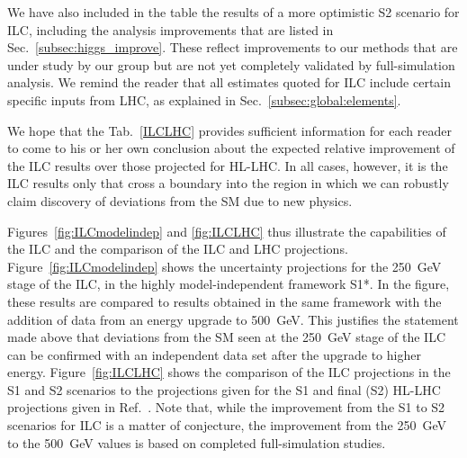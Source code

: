    We
have also included in the table the results of a more  optimistic S2
scenario for ILC,  including the analysis improvements that are listed
in Sec.~\ref{subsec:higgs_improve}.   These reflect improvements to our
methods that are under study by our group but are not yet completely
validated by full-simulation analysis.   We remind the reader that all
estimates quoted for ILC include certain specific inputs from LHC,
as explained in Sec.~\ref{subsec:global:elements}.

We hope that the Tab.~\ref{ILCLHC} provides sufficient information for
each reader to come to his or her own conclusion about the  expected relative
improvement of the ILC results over those projected for HL-LHC.
In all cases, however, it is the ILC results only that cross a
boundary into the region in which  we can robustly claim discovery of
deviations from the SM due to new physics.




Figures~\ref{fig:ILCmodelindep} and \ref{fig:ILCLHC}  thus illustrate the
capabilities of the ILC and the comparison of the ILC and LHC
projections.  Figure~\ref{fig:ILCmodelindep} shows the uncertainty
projections for the 250~GeV stage of the ILC, in the highly
model-independent framework S1*.  In the figure, these results are
compared to results obtained in the same framework with the addition
of data from an energy upgrade to 500~GeV.   This justifies the
statement made above that deviations from the SM seen at the 250~GeV
stage of the ILC can be confirmed with an independent data set after
the upgrade to higher energy.   Figure~\ref{fig:ILCLHC} shows the
comparison of the ILC projections in the S1 and S2 scenarios to the 
projections given for the S1 and final (S2)  HL-LHC projections given
in Ref.~\cite{Cepeda:2019klc}.
Note that, while the improvement from the S1 to S2 scenarios for ILC  is a
matter of conjecture, the improvement from the 250~GeV to the 500~GeV
values is based on completed full-simulation studies.

